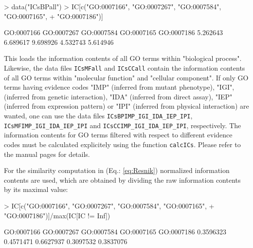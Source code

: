 \documentclass[12pt,a4paper]{article}
\begin{document}
\begin{Schunk}
\begin{Sinput}
> data("ICsBPall")
> IC[c("GO:0007166", "GO:0007267", "GO:0007584", "GO:0007165", 
+     "GO:0007186")]
\end{Sinput}
\begin{Soutput}
GO:0007166 GO:0007267 GO:0007584 GO:0007165 GO:0007186 
  5.262643   6.689617   9.698926   4.532743   5.614946 
\end{Soutput}
\end{Schunk}
This loads the information contents of all GO terms within "biological process". Likewise, the data files {\tt ICsMFall} and {\tt ICsCCall} contain the information contents of all GO terms within "molecular function" and "cellular component". If only GO terms having evidence codes "IMP" (inferred from mutant phenotype), "IGI", (inferred from genetic interaction), "IDA" (inferred from direct assay), "IEP" (inferred from expression pattern) or "IPI" (inferred from physical interaction) are wanted, one can use the data files {\tt ICsBPIMP\_IGI\_IDA\_IEP\_IPI}, {\tt ICsMFIMP\_IGI\_IDA\_IEP\_IPI} and {\tt ICsCCIMP\_IGI\_IDA\_IEP\_IPI}, respectively. The information contents for GO terms filtered with respect to different evidence codes must be calculated explicitely using the function {\tt calcICs}. Please refer to the manual pages for details.

For the similarity computation in (Eq.: \ref{eq:Resnik}) normalized information contents are used, which are obtained by dividing the raw information contents by its maximal value:
\begin{Schunk}
\begin{Sinput}
> IC[c("GO:0007166", "GO:0007267", "GO:0007584", "GO:0007165", 
+     "GO:0007186")]/max(IC[IC != Inf])
\end{Sinput}
\begin{Soutput}
GO:0007166 GO:0007267 GO:0007584 GO:0007165 GO:0007186 
 0.3596323  0.4571471  0.6627937  0.3097532  0.3837076 
\end{Soutput}
\end{Schunk}
\end{document}
